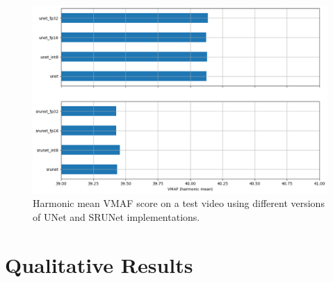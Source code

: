 \begin{figure}[ht]
\includegraphics[width=1.0\textwidth]{static/2023_03_17_barplot_vmaf_harmonic_mean.png}
\caption{Harmonic mean VMAF score on a test video using different versions of UNet and SRUNet implementations.}
\label{fig:vmaf-harmonic-mean}
\end{figure}

\clearpage

\section{Qualitative Results}
\label{sec:qualitative-results}


